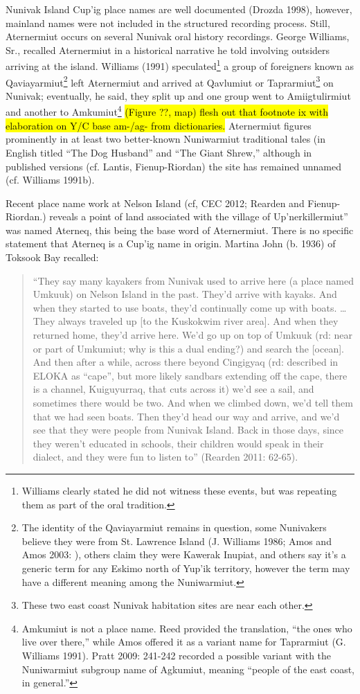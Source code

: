 Nunivak Island Cup’ig place names are well documented (Drozda 1998), however, mainland names were not included in the structured recording process. Still, Aternermiut occurs on several Nunivak oral history recordings. George Williams, Sr., recalled Aternermiut in a historical narrative he told involving outsiders arriving at the island. Williams (1991) speculated\footnote{Williams clearly stated he did not witness these events, but was repeating them as part of the oral tradition.}  a group of foreigners known as Qaviayarmiut\footnote{The identity of the Qaviayarmiut remains in question, some Nunivakers believe they were from St. Lawrence Island (J. Williams 1986; Amos and Amos 2003: ), others claim they were Kawerak Inupiat, and others say it’s a generic term for any Eskimo north of Yup’ik territory, however the term may have a different meaning among the Nuniwarmiut.}  left Aternermiut and arrived at Qavlumiut or Taprarmiut\footnote{These two east coast Nunivak habitation sites are near each other.}  on Nunivak; eventually, he said, they split up and one group went to Amiigtulirmiut and another to Amkumiut\footnote{Amkumiut is not a place name. Reed provided the translation, “the ones who live over there,” while Amos offered it as a variant name for Taprarmiut (G. Williams 1991). Pratt 2009: 241-242 recorded a possible variant with the Nuniwarmiut subgroup name of Agkumiut, meaning “people of the east coast, in general.”}  \hl{(Figure ??, map) flesh out that footnote ix with elaboration on Y/C base am-/ag- from dictionaries.} Aternermiut figures prominently in at least two better-known Nuniwarmiut traditional tales (in English titled “The Dog Husband” and “The Giant Shrew,” although in published versions (cf. Lantis, Fienup-Riordan) the site has remained unnamed (cf. Williams 1991b).

Recent place name work at Nelson Island (cf, CEC 2012; Rearden and Fienup-Riordan.) reveals a point of land associated with the village of Up’nerkillermiut” was named Aterneq, this being the base word of Aternermiut.  There is no specific statement that Aterneq is a Cup’ig name in origin. Martina John (b. 1936) of Toksook Bay recalled:

\begin{quote}
    	“They say many kayakers from Nunivak used to arrive here (a place named 	Umkuuk) on Nelson Island in the past. They’d arrive with kayaks. And when they 	started to use boats, they’d continually come up with boats. … They always 	traveled up {[}to the Kuskokwim river area{]}. And when they returned home, they’d 	arrive here. We’d go up on top of Umkuuk (rd: near or part of Umkumiut; why is 	this a dual ending?) and search the {[}ocean{]}. And then after a while, across there 	beyond Cingigyaq (rd: described in ELOKA as “cape”, but more likely sandbars 	extending off the cape, there is a channel, Kuiguyurraq, that cuts across it) we’d 	see a sail, and sometimes there would be two. And when we climbed down, we’d 	tell them that we had seen boats. Then they’d head our way and arrive, and we’d 	see that they were people from Nunivak Island. Back in those days, since they 	weren’t educated in schools, their children would speak in their dialect, and they 	were fun to listen to” (Rearden 2011: 62-65).
\end{quote}

